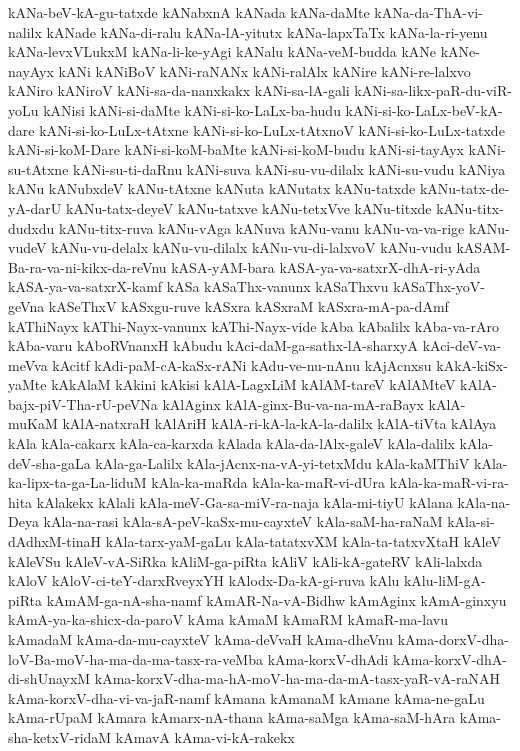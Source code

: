 {kANa-beV-kA-gu-tatxde
kANabxnA
kANada
kANa-daMte
kANa-da-ThA-vi-nalilx
kANade
kANa-di-ralu
kANa-lA-yitutx
kANa-lapxTaTx
kANa-la-ri-yenu
kANa-levxVLukxM
kANa-li-ke-yAgi
kANalu
kANa-veM-budda
kANe
kANe-nayAyx
kANi
kANiBoV
kANi-raNANx
kANi-ralAlx
kANire
kANi-re-lalxvo
kANiro
kANiroV
kANi-sa-da-nanxkakx
kANi-sa-lA-gali
kANi-sa-likx-paR-du-viR-yoLu
kANisi
kANi-si-daMte
kANi-si-ko-LaLx-ba-hudu
kANi-si-ko-LaLx-beV-kA-dare
kANi-si-ko-LuLx-tAtxne
kANi-si-ko-LuLx-tAtxnoV
kANi-si-ko-LuLx-tatxde
kANi-si-koM-Dare
kANi-si-koM-baMte
kANi-si-koM-budu
kANi-si-tayAyx
kANi-su-tAtxne
kANi-su-ti-daRnu
kANi-suva
kANi-su-vu-dilalx
kANi-su-vudu
kANiya
kANu
kANubxdeV
kANu-tAtxne
kANuta
kANutatx
kANu-tatxde
kANu-tatx-de-yA-darU
kANu-tatx-deyeV
kANu-tatxve
kANu-tetxVve
kANu-titxde
kANu-titx-dudxdu
kANu-titx-ruva
kANu-vAga
kANuva
kANu-vanu
kANu-va-va-rige
kANu-vudeV
kANu-vu-delalx
kANu-vu-dilalx
kANu-vu-di-lalxvoV
kANu-vudu
kASAM-Ba-ra-va-ni-kikx-da-reVnu
kASA-yAM-bara
kASA-ya-va-satxrX-dhA-ri-yAda
kASA-ya-va-satxrX-kamf
kASa
kASaThx-vanunx
kASaThxvu
kASaThx-yoV-geVna
kASeThxV
kASxgu-ruve
kASxra
kASxraM
kASxra-mA-pa-dAmf
kAThiNayx
kAThi-Nayx-vanunx
kAThi-Nayx-vide
kAba
kAbalilx
kAba-va-rAro
kAba-varu
kAboRVnanxH
kAbudu
kAci-daM-ga-sathx-lA-sharxyA
kAci-deV-va-meVva
kAcitf
kAdi-paM-cA-kaSx-rANi
kAdu-ve-nu-nAnu
kAjAcnxsu
kAkA-kiSx-yaMte
kAkAlaM
kAkini
kAkisi
kAlA-LagxLiM
kAlAM-tareV
kAlAMteV
kAlA-bajx-piV-Tha-rU-peVNa
kAlAginx
kAlA-ginx-Bu-va-na-mA-raBayx
kAlA-muKaM
kAlA-natxraH
kAlAriH
kAlA-ri-kA-la-kA-la-dalilx
kAlA-tiVta
kAlAya
kAla
kAla-cakarx
kAla-ca-karxda
kAlada
kAla-da-lAlx-galeV
kAla-dalilx
kAla-deV-sha-gaLa
kAla-ga-Lalilx
kAla-jAcnx-na-vA-yi-tetxMdu
kAla-kaMThiV
kAla-ka-lipx-ta-ga-La-liduM
kAla-ka-maRda
kAla-ka-maR-vi-dUra
kAla-ka-maR-vi-ra-hita
kAlakekx
kAlali
kAla-meV-Ga-sa-miV-ra-naja
kAla-mi-tiyU
kAlana
kAla-na-Deya
kAla-na-rasi
kAla-sA-peV-kaSx-mu-cayxteV
kAla-saM-ha-raNaM
kAla-si-dAdhxM-tinaH
kAla-tarx-yaM-gaLu
kAla-tatatxvXM
kAla-ta-tatxvXtaH
kAleV
kAleVSu
kAleV-vA-SiRka
kAliM-ga-piRta
kAliV
kAli-kA-gateRV
kAli-lalxda
kAloV
kAloV-ci-teY-darxRveyxYH
kAlodx-Da-kA-gi-ruva
kAlu
kAlu-liM-gA-piRta
kAmAM-ga-nA-sha-namf
kAmAR-Na-vA-Bidhw
kAmAginx
kAmA-ginxyu
kAmA-ya-ka-shicx-da-paroV
kAma
kAmaM
kAmaRM
kAmaR-ma-lavu
kAmadaM
kAma-da-mu-cayxteV
kAma-deVvaH
kAma-dheVnu
kAma-dorxV-dha-loV-Ba-moV-ha-ma-da-ma-tasx-ra-veMba
kAma-korxV-dhAdi
kAma-korxV-dhA-di-shUnayxM
kAma-korxV-dha-ma-hA-moV-ha-ma-da-mA-tasx-yaR-vA-raNAH
kAma-korxV-dha-vi-va-jaR-namf
kAmana
kAmanaM
kAmane
kAma-ne-gaLu
kAma-rUpaM
kAmara
kAmarx-nA-thana
kAma-saMga
kAma-saM-hAra
kAma-sha-ketxV-ridaM
kAmavA
kAma-vi-kA-rakekx
}
